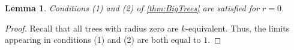 \documentclass[12pt,notitlepage,a4paper]{article}
\newtheorem{lemma}{Lemma}[section]
\theoremstyle{definition}
\newcommand{\N}{\mathbb{N}}
\newcommand{\Ln}{\lim\limits_{n\to \infty}}
\begin{document}
\begin{lemma}
	Conditions (1) and (2) of \cref{thm:BigTrees} 
	are satisfied for $r=0$.
\end{lemma}
\begin{proof}
	Recall that	all trees with radius zero are $k$-equivalent. Thus,
	the limits
	appearing in conditions (1) and (2) are both equal to $1$.
\end{proof}

%
%		
%	
\end{document}

